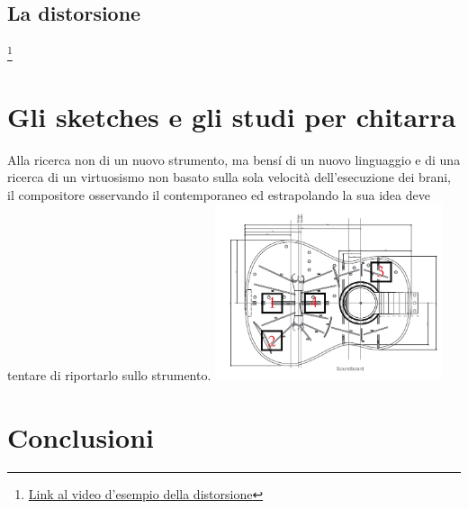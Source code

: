 \documentclass[oneside]{article}
\begin{document}
\begin{multicols*}{2}
\subsection{La distorsione} 


\footnote{\href{https://www.youtube.com/watch?v=K3yqyxcJStg}{Link al video d'esempio della distorsione}}



\section{ Gli sketches e gli studi per chitarra}

Alla ricerca non di un nuovo strumento, ma bensí di un nuovo linguaggio e di una ricerca di un virtuosismo non basato sulla sola velocità dell’esecuzione dei brani, il compositore osservando il contemporaneo ed estrapolando la sua idea deve tentare di riportarlo sullo strumento.
\includegraphics[width=0.5\textwidth]{img/luoghi_perc.png}


\section{ Conclusioni}


\end{multicols*}
\end{document}
